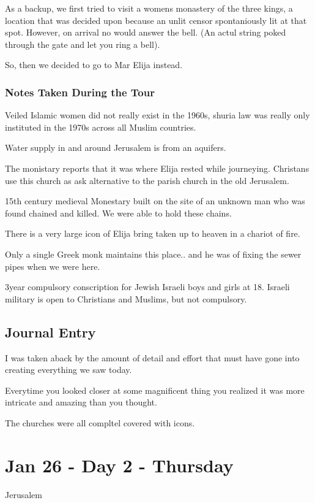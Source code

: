 \documentclass[letterpaper]{report}
\begin{document}
As a backup, we first tried to visit a womens monastery of the three kings,
a location that was decided upon because an unlit censor spontaniously lit at that spot.
However, on arrival no would answer the bell. (An actul string poked through the gate and let you ring a bell).

So, then we decided to go to Mar Elija instead.

\subsubsection{Notes Taken During the Tour}
Veiled Islamic women did not really exist in the 1960s, shuria law was really only instituted in the 1970s across all Muslim countries.

Water supply in and around Jerusalem is from an aquifers.

The monistary reports that it was where Elija rested while journeying. Christans use this church as ask alternative to the parish church in the old Jerusalem. 

15th century medieval Monestary built on the site of an unknown man who was found chained and killed. We were able to hold these chains.

There is a very large icon of Elija bring taken up to heaven in a chariot of fire.

Only a single Greek monk maintains this place.. and he was of fixing the sewer pipes when we were here.

3year compulsory conscription for Jewish Israeli boys and girls at 18. Israeli military is open to Christians and Muslims, but not compulsory.

\clearpage
\subsection{Journal Entry}
I was taken aback by the amount of detail and effort that must have gone into creating everything we saw today.

Everytime you looked closer at some magnificent thing you realized it was more intricate and amazing than you thought.

The churches were all compltel covered with icons. 

\clearpage
\section{Jan 26 - Day 2 - Thursday}
Jerusalem
\end{document}
